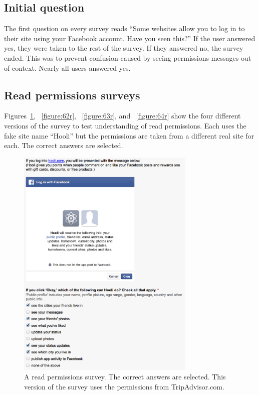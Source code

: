 \documentclass[10pt]{sig-alternate-10pt}
\begin{document}
\subsection{Initial question}

The first question on every survey reads ``Some websites allow you to log in to their site using your Facebook account. Have you seen this?'' If the user answered yes, they were taken to the rest of the survey. If they answered no, the survey ended. This was to prevent confusion caused by seeing permissions messages out of context. Nearly all users answered yes.

\subsection{Read permissions surveys}
\label{appendix:readsurveys}

Figures~\ref{figure:61r}, ~\ref{figure:62r}, ~\ref{figure:63r}, and ~\ref{figure:64r} show the four different versions of the survey to test understanding of read permissions. Each uses the fake site name ``Hooli'' but the permissions are taken from a different real site for each. The correct answers are selected.

\begin{figure}[h!]
  \centering
  \includegraphics[width=8.5cm]{61r}
  \caption{A read permissions survey. The correct answers are selected. This version of the survey uses the permissions from TripAdvisor.com.}
  \label{figure:61r}
\end{figure}
\end{document}
